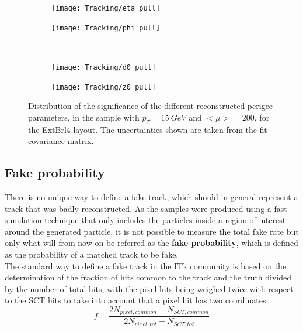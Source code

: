 \documentclass[a4paper,twoside,12pt]{article}
\begin{document}
\begin{figure}
\begin{subfigure}{.5\linewidth}
\texttt{[image: Tracking/eta\_pull]}
\caption{}
\label{fig:tracking:eta_pull}
\end{subfigure}
\begin{subfigure}{.5\linewidth}
\texttt{[image: Tracking/phi\_pull]}
\caption{}
\label{fig:tracking:phi_pull}
\end{subfigure}\\[1ex]
\begin{subfigure}{.5\linewidth}
\texttt{[image: Tracking/d0\_pull]}
\caption{}
\label{fig:tracking:d0_pull}
\end{subfigure}
\begin{subfigure}{.5\linewidth}
\texttt{[image: Tracking/z0\_pull]}
\caption{}
\label{fig:tracking:z0_pull}
\end{subfigure}

\caption{Distribution of the significance of the different reconstructed perigee parameters, in the sample with $p_{T} = 15\ GeV$ and $<\mu> = 200$, for the ExtBrl4 layout. The
uncertainties shown are taken from the fit covariance matrix.}
\label{fig:tracking:pull}
\end{figure}

\subsection{Fake probability}
There is no unique way to define a fake track, which should in general represent a track that was badly reconstructed. As the samples were produced using a fast simulation technique that
only includes the particles inside a region of interest around the generated particle, it is not possible to measure the total fake rate but only what will from now on be referred
as the \textbf{fake probability}, which is defined as the probability of a matched track to be fake. \\

The standard way to define a fake track in the ITk community is based on the determination of the fraction of hits common to the track and the truth divided by the number of total hits, with the pixel hits being weighed twice with respect to the SCT hits to take into account that a pixel hit has two coordinates: \\
$$
f = \frac{2N_{pixel, common} + N_{SCT, common}}{2N_{pixel, tot} + N_{SCT, tot}}
$$
\end{document}
